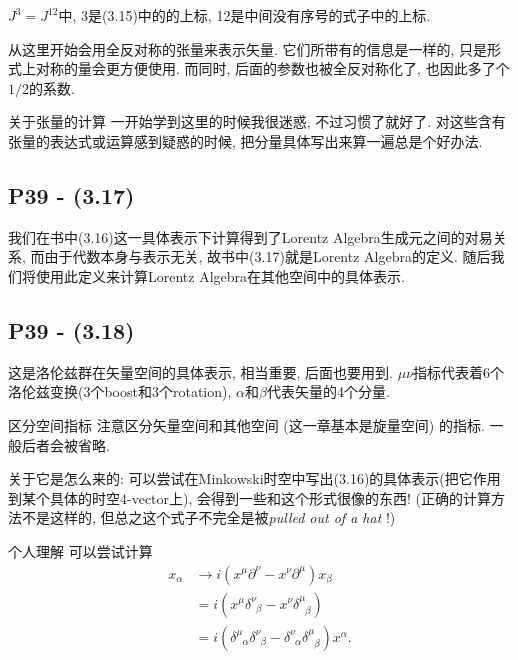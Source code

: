 $J^3 = J^{12}$中, 3是(3.15)中的的上标, 12是中间没有序号的式子中的上标.

从这里开始会用全反对称的张量来表示矢量.
它们所带有的信息是一样的, 只是形式上对称的量会更方便使用.
而同时, 后面的参数也被全反对称化了, 也因此多了个$1/2$的系数.

\begin{mybox}{关于张量的计算}
  一开始学到这里的时候我很迷惑, 不过习惯了就好了.
  对这些含有张量的表达式或运算感到疑惑的时候, 把分量具体写出来算一遍总是个好办法.
\end{mybox}

\subsection{P39 - (3.17)}

我们在书中(3.16)这一具体表示下计算得到了Lorentz Algebra生成元之间的对易关系, 而由于代数本身与表示无关, 故书中(3.17)就是Lorentz Algebra的定义.
随后我们将使用此定义来计算Lorentz Algebra在其他空间中的具体表示.

\subsection{P39 - (3.18)}

这是洛伦兹群在矢量空间的具体表示, 相当重要, 后面也要用到.
$\mu\nu$指标代表着6个洛伦兹变换(3个boost和3个rotation), $\alpha$和$\beta$代表矢量的4个分量.

\begin{mybox}{区分空间指标}
  注意区分矢量空间和其他空间 (这一章基本是旋量空间) 的指标.
  一般后者会被省略.
\end{mybox}

关于它是怎么来的: 可以尝试在Minkowski时空中写出(3.16)的具体表示(把它作用到某个具体的时空$4$-vector上), 会得到一些和这个形式很像的东西! (正确的计算方法不是这样的, 但总之这个式子不完全是被\textit{pulled out of a hat} !)

\begin{mybox}{个人理解}
  可以尝试计算
  \begin{equation}
    \begin{aligned}
      x_\alpha & \rightarrow i(x^\mu\partial^\nu-x^\nu\partial^\mu)x_\beta                                                                                         \\
               & = i(x^\mu\delta^\nu_{\phantom{\nu}\beta} - x^\nu\delta^\mu_{\phantom{\mu}\beta})                                                                  \\
               & = i(\delta^\mu_{\phantom{\mu}\alpha} \delta^\nu_{\phantom{\nu}\beta} - \delta^\nu_{\phantom{\nu}\alpha} \delta^\mu_{\phantom{\mu}\beta})x^\alpha.
    \end{aligned}
  \end{equation}
\end{mybox}

